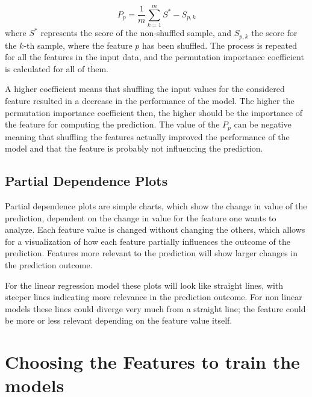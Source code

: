 \begin{equation}\label{eq:perm}
P_p = \frac{1}{m}\sum_{k=1}^{m}S^*-{S_{p,k}}
\end{equation} 
where $S^*$ represents the score of the non-shuffled sample, and $S_{p,k}$ the score for the $k$-th sample, where the feature $p$ has been shuffled.
The process is repeated for all the features in the input data, and the permutation importance coefficient is calculated for all of them.

A higher coefficient means that shuffling the input values for the considered feature resulted in a decrease in the performance of the model. The higher the permutation importance coefficient then, the higher should be the importance of the feature for computing the prediction. The value of the $P_p$ can be negative meaning that shuffling the features actually improved the performance of the model and that the feature is probably not influencing the prediction.

\subsection{Partial Dependence Plots}
Partial dependence plots are simple charts, which show the change in value of the prediction, dependent on the change in value for the feature one wants to analyze. Each feature value is changed without changing the others, which allows for a visualization of how each feature partially influences the outcome of the prediction. Features more relevant to the prediction will show larger changes in the prediction outcome.

For the linear regression model these plots will look like straight lines, with steeper lines indicating more relevance in the prediction outcome. For non linear models these lines could diverge very much from a straight line; the feature could be more or less relevant depending on the feature value itself.  

\section{Choosing the Features to train the models}\label{features}

